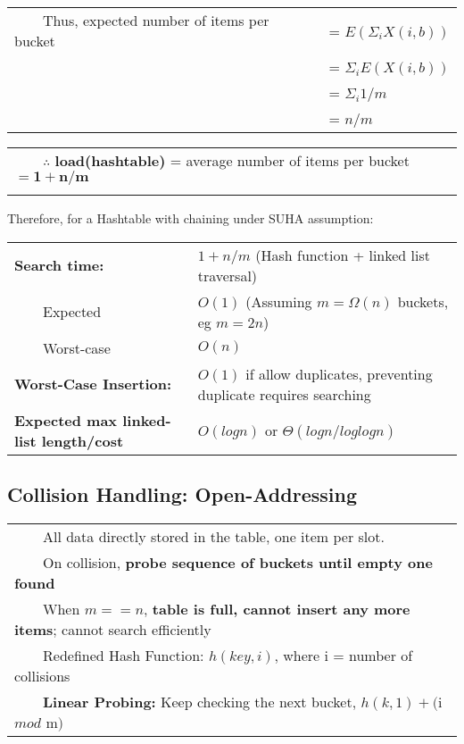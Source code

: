 \documentclass{article}
\newcommand{\tabitem}{~~\llap{\textbullet}~~}
\begin{document}
    \begin{tabular}{ll}
        \tabitem Thus, expected number of items per bucket &= $E(\Sigma_{i}X(i, b))$\\
        &= $\Sigma_{i}E(X(i, b))$\\
        &= $\Sigma_{i}1/m$\\
        &= $n/m$\\
    \end{tabular}

    \begin{tabular}{l}
        \tabitem $\therefore$ \textbf{load(hashtable)} = average number of items per bucket $\bm{= 1 + n/m}$\\\\ 
    \end{tabular}

    Therefore, for a Hashtable with chaining under SUHA assumption:\\

    \begin{tabular}{ll}
        \toprule
        \textbf{Search time:} & $1+ n/m$ (Hash function + linked list traversal)\\
        \tabitem Expected & $O(1)$  (Assuming $m = \Omega(n)$ buckets, eg $m = 2n$)\\
        \tabitem Worst-case & $O(n)$\\
        \midrule
        \textbf{Worst-Case Insertion:} & $O(1)$ if allow duplicates, preventing duplicate requires searching\\
        \midrule
        \textbf{Expected max linked-list length/cost} & $O(logn)$ or $\Theta(logn/loglogn)$\\
        \bottomrule
    \end{tabular}

    \pagebreak

    \subsection{Collision Handling: Open-Addressing}

    
    \begin{tabular}{l}
        \tabitem All data directly stored in the table, one item per slot.\\
        \tabitem On collision, \textbf{probe sequence of buckets until empty one found}\\
        \tabitem When $m == n$, \textbf{table is full, cannot insert any more items}; cannot search efficiently\\
        \tabitem Redefined Hash Function: $h(key, i)$, where i = number of collisions\\
        \tabitem \textbf{Linear Probing:} Keep checking the next bucket, $h(k, 1) + ($i $mod$ m$)$\\
    \end{tabular}
\end{document}
